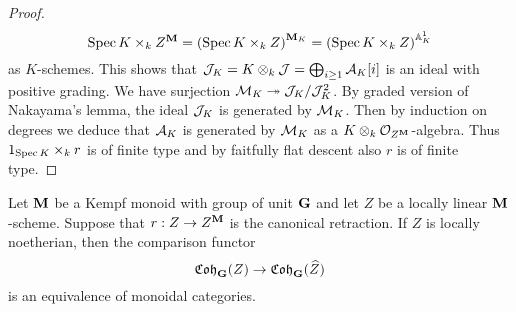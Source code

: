\begin{proof}
$$\mathrm{Spec}\, K\times_k Z^{\mathbf{M}} = \left(\mathrm{Spec}\, K \times_k Z\right)^{\mathbf{M}_K} = \left(\mathrm{Spec}\, K \times_k Z\right)^{\mathbb{A}^1_K}$$
as $K$-schemes. This shows that ${\mathcal J}_K = K\otimes_k{\mathcal J} = \bigoplus_{i\geq 1} {\mathcal A}_K[i]$ is an ideal with positive grading. We have surjection ${\mathcal M}_K\twoheadrightarrow {\mathcal J}_K/{\mathcal J}_K^2$. By graded version of Nakayama's lemma, the ideal ${\mathcal J}_K$  is generated by ${\mathcal M}_K$. Then by induction on degrees we deduce that ${\mathcal A}_K$ is generated by ${\mathcal M}_K$ as a $K\otimes_k{\mathcal O}_{Z^{\mathbf{M}}}$-algebra. Thus $1_{\mathrm{Spec}\, K}\times_k r$ is of finite type and by faitfully flat descent also $r$ is of finite type.
\end{proof}

\begin{theorem}\label{theorem:comparison_functor_is_an_equivalence}
Let $\mathbf{M}$ be a Kempf monoid with group of unit $\mathbf{G}$ and let $Z$ be a locally linear $\mathbf{M}$-scheme. Suppose that $r:Z\rightarrow Z^{\mathbf{M}}$ is the canonical retraction. If $Z$ is locally noetherian, then the comparison functor
$$\mathfrak{Coh}_{\mathbf{G}}(Z)\rightarrow \mathfrak{Coh}_{\mathbf{G}}(\widehat{Z})$$
is an equivalence of monoidal categories.
\end{theorem}

